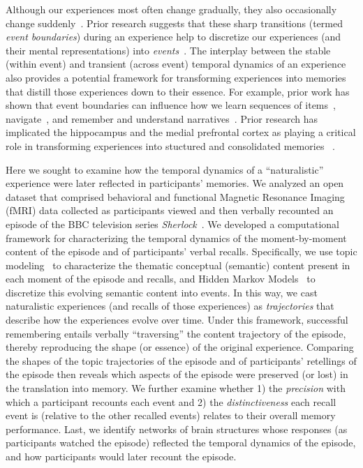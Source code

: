 \documentclass{article}
\begin{document}
Although our experiences most often change gradually, they also occasionally change suddenly~\citep[e.g., when we walk through a doorway; ][]{RadvZack17}.  Prior research suggests that these sharp transitions (termed \textit{event boundaries}) during an experience help to discretize our experiences (and their mental representations) into \textit{events}~\citep{RadvZack17, BrunEtal18, HeusEtal18b, ClewDava17, EzzyDava11, DuBrDava13}.  The interplay between the stable (within event) and transient (across event) temporal dynamics of an experience also provides a potential framework for transforming experiences into memories that distill those experiences down to their essence.  For example, prior work has shown that event boundaries can influence how we learn sequences of items~\citep{HeusEtal18b, DuBrDava13}, navigate~\citep{BrunEtal18}, and remember and understand narratives~\citep{ZwaaRadv98, EzzyDava11}. Prior research has implicated the hippocampus and the medial prefrontal cortex as playing a critical role in transforming experiences into stuctured and consolidated memories ~\citep{TompDava17}.

Here we sought to examine how the temporal dynamics of a ``naturalistic'' experience were later reflected in participants' memories.  We analyzed an open dataset that comprised behavioral and functional Magnetic Resonance Imaging (fMRI) data collected as participants viewed and then verbally recounted an episode of the BBC television series \textit{Sherlock}~\citep{ChenEtal17}.  We developed a computational framework for characterizing the temporal dynamics of the moment-by-moment content of the episode and of participants' verbal recalls.  Specifically, we use topic modeling~\citep{BleiEtal03} to characterize the thematic conceptual (semantic) content present in each moment of the episode and recalls, and Hidden Markov Models~\citep{Rabi89, BaldEtal17} to discretize this evolving semantic content into events.  In this way, we cast naturalistic experiences (and recalls of those experiences) as \textit{trajectories} that describe how the experiences evolve over time. Under this framework, successful remembering entails verbally ``traversing'' the content trajectory of the episode, thereby reproducing the shape (or essence) of the original experience.  Comparing the shapes of the topic trajectories of the episode and of participants' retellings of the episode then reveals which aspects of the episode were preserved (or lost) in the translation into memory.  We further examine whether 1) the \textit{precision} with which a participant recounts each event and 2) the \textit{distinctiveness} each recall event is (relative to the other recalled events) relates to their overall memory performance.  Last, we identify networks of  brain structures whose responses (as participants watched the episode) reflected the temporal dynamics of the episode, and how participants would later recount the episode.
\end{document}
